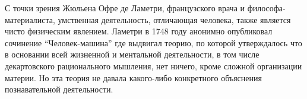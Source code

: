 С точки зрения Жюльена Офре де Ламетри, французского врача и философа-материалиста, умственная деятельность, отличающая человека, также является чисто физическим явлением. Ламетри в 1748 году анонимно опубликовал сочинение ``Человек-машина'' где выдвигал теорию, по которой утверждалось что в основании всей жизненной и ментальной деятельности, в том числе декартовского рационального мышления, нет ничего, кроме сложной организации материи. Но эта теория не давала какого-либо конкретного объяснения познавательной деятельности.
